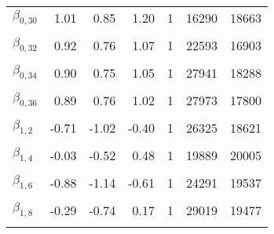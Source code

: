 \begin{table}
\begin{tabular}[t]{lrrrrrr}
$\beta_{0, 30}$ & 1.01 & 0.85 & 1.20 & 1 & 16290 & 18663\\
\cellcolor{gray!6}{$\beta_{0, 31}$} & \cellcolor{gray!6}{0.82} & \cellcolor{gray!6}{0.61} & \cellcolor{gray!6}{1.00} & \cellcolor{gray!6}{1} & \cellcolor{gray!6}{17815} & \cellcolor{gray!6}{14700}\\
$\beta_{0, 32}$ & 0.92 & 0.76 & 1.07 & 1 & 22593 & 16903\\
\cellcolor{gray!6}{$\beta_{0, 33}$} & \cellcolor{gray!6}{0.67} & \cellcolor{gray!6}{0.47} & \cellcolor{gray!6}{0.86} & \cellcolor{gray!6}{1} & \cellcolor{gray!6}{8179} & \cellcolor{gray!6}{14140}\\
$\beta_{0, 34}$ & 0.90 & 0.75 & 1.05 & 1 & 27941 & 18288\\
\cellcolor{gray!6}{$\beta_{0, 35}$} & \cellcolor{gray!6}{0.98} & \cellcolor{gray!6}{0.80} & \cellcolor{gray!6}{1.17} & \cellcolor{gray!6}{1} & \cellcolor{gray!6}{18186} & \cellcolor{gray!6}{17930}\\
$\beta_{0, 36}$ & 0.89 & 0.76 & 1.02 & 1 & 27973 & 17800\\
\cellcolor{gray!6}{$\beta_{1, 1}$} & \cellcolor{gray!6}{-0.22} & \cellcolor{gray!6}{-0.53} & \cellcolor{gray!6}{0.08} & \cellcolor{gray!6}{1} & \cellcolor{gray!6}{24033} & \cellcolor{gray!6}{20005}\\
$\beta_{1, 2}$ & -0.71 & -1.02 & -0.40 & 1 & 26325 & 18621\\
\cellcolor{gray!6}{$\beta_{1, 3}$} & \cellcolor{gray!6}{-0.57} & \cellcolor{gray!6}{-0.84} & \cellcolor{gray!6}{-0.29} & \cellcolor{gray!6}{1} & \cellcolor{gray!6}{16844} & \cellcolor{gray!6}{17044}\\
$\beta_{1, 4}$ & -0.03 & -0.52 & 0.48 & 1 & 19889 & 20005\\
\cellcolor{gray!6}{$\beta_{1, 5}$} & \cellcolor{gray!6}{-0.37} & \cellcolor{gray!6}{-0.60} & \cellcolor{gray!6}{-0.15} & \cellcolor{gray!6}{1} & \cellcolor{gray!6}{23202} & \cellcolor{gray!6}{19454}\\
$\beta_{1, 6}$ & -0.88 & -1.14 & -0.61 & 1 & 24291 & 19537\\
\cellcolor{gray!6}{$\beta_{1, 7}$} & \cellcolor{gray!6}{-0.43} & \cellcolor{gray!6}{-0.82} & \cellcolor{gray!6}{-0.04} & \cellcolor{gray!6}{1} & \cellcolor{gray!6}{17776} & \cellcolor{gray!6}{14256}\\
$\beta_{1, 8}$ & -0.29 & -0.74 & 0.17 & 1 & 29019 & 19477\\
\cellcolor{gray!6}{$\beta_{1, 9}$} & \cellcolor{gray!6}{-0.94} & \cellcolor{gray!6}{-1.38} & \cellcolor{gray!6}{-0.50} & \cellcolor{gray!6}{1} & \cellcolor{gray!6}{16813} & \cellcolor{gray!6}{14731}\\

\end{tabular}
\end{table}

